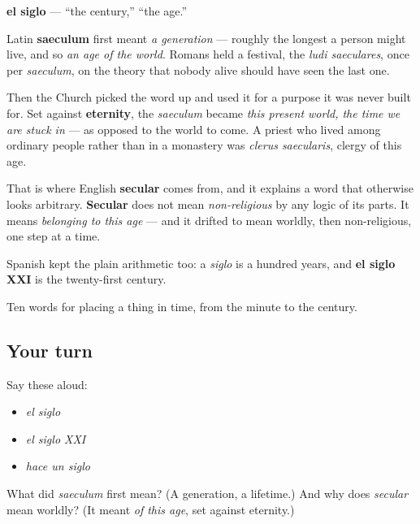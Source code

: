 \begin{cousinweb}
\textbf{el siglo} — \textquotedblleft{}the century,\textquotedblright{} \textquotedblleft{}the age.\textquotedblright{}

Latin \textbf{saeculum} first meant \emph{a generation} — roughly the longest a person might live, and so \emph{an age of the world}. Romans held a festival, the \emph{ludi saeculares}, once per \emph{saeculum}, on the theory that nobody alive should have seen the last one.

Then the Church picked the word up and used it for a purpose it was never built for. Set against \textbf{eternity}, the \emph{saeculum} became \emph{this present world, the time we are stuck in} — as opposed to the world to come. A priest who lived among ordinary people rather than in a monastery was \emph{clerus saecularis}, clergy of this age.

That is where English \textbf{secular} comes from, and it explains a word that otherwise looks arbitrary. \textbf{Secular} does not mean \emph{non-religious} by any logic of its parts. It means \emph{belonging to this age} — and it drifted to mean worldly, then non-religious, one step at a time.

Spanish kept the plain arithmetic too: a \emph{siglo} is a hundred years, and \textbf{el siglo XXI} is the twenty-first century.
\end{cousinweb}

\begin{grammarlens}[title={What you've built}]
Ten words for placing a thing in time, from the minute to the century.
\end{grammarlens}

\subsection*{Your turn}
Say these aloud:

\begin{itemize}
\raggedright
  \item \emph{el siglo}
  \item \emph{el siglo XXI}
  \item \emph{hace un siglo}
\end{itemize}

\begin{tcolorbox}[breakable,colback=teal!4,colframe=teal!35!black,title={Before you move on}]
What did \emph{saeculum} first mean? (A generation, a lifetime.) And why does \emph{secular} mean worldly? (It meant \emph{of this age}, set against eternity.)
\end{tcolorbox}
